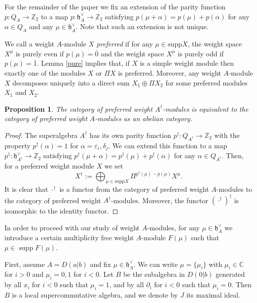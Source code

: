 \documentclass[12pt]{amsart}
\makeatletter
\def\@putname#1#2#3#4{\def\@@ref{#3}\let\old@bf\bf
        \def\bf##1{\old@bf\if?\noexpand##1?{#4}\else##1\fi}%
	#1{#2}%
        \let\bf\old@bf}
\def\@putname#1#2#3#4{\def\@@ref{#3}\let\old@bf\bf	%
	\let\old@reset@font\reset@font			%
        \def\bf##1{\old@bf\if?\noexpand##1?{#4}\else##1\fi}%
	\def\reset@font##1##2{\old@reset@font##1\if?\noexpand##2?{#4}\else##2\fi}#1{#2}%
        \let\bf\old@bf\let\reset@font\old@reset@font}
\let\my@ref=\ref
\def\ref#1{\@putname\my@ref{#1}{#1}{\tiny\rm\@@ref}}
\theoremstyle{plain} %
\numberwithin{equation}{section}
\theoremstyle{definition}
\theoremstyle{remark}
\theoremstyle{plain} %
\newtheorem{proposition}[definition]{Proposition}
\newcommand{\hh}{\mathfrak{h}}
\newcommand{\ZZ}{\mathbb{Z}}
\newcommand{\supp}{\mathrm{supp}}
\newcommand{\Z}{\mathbb{Z}}
\newcommand{\gh}{\mathfrak{h}}
\def\gh{\mathfrak{h}}
\makeatother
\begin{document}
        
  For the remainder of the paper we fix an extension  of the parity function $p:Q_A\to\Z_2$ to a  map $p:\hh_A^{\vee}\to \ZZ_2$ satisfying $p(\mu+\alpha)=p(\mu)+p(\alpha)$ for any $\alpha\in Q_A$
          and any $\mu\in\hh_A^{\vee}$. Note that such an extension is not unique.
          
 We call a weight $A$-module $X$ \emph{preferred} if for any $\mu \in \supp X$, the weight space $X^\mu$ is purely even if $p(\mu)=\bar 0$ and the weight space $X^\mu$ is purely odd if $p(\mu)=\bar 1$.  Lemma \ref{pure} implies that, if $X$ is a simple weight module then exactly one of the modules $X$ or $\Pi X$ is preferred. 
Moreover, any weight $A$-module
      $X$ decomposes uniquely into a direct sum $X_1\oplus\Pi X_2$ for some preferred modules $X_1$ and $X_2$. 

             
        
        \begin{proposition}\label{dagger} The category of preferred weight $A^\dagger$-modules is equivalent to the category of preferred weight $A$-modules as an abelian category.
        \end{proposition}
        \begin{proof}  The superalgebra $A^\dagger$ has its own parity function $p^\dagger:Q_{A^\dagger}\to\Z_2$ with the property
          $p^{\dagger} (\alpha) = 1$ for $\alpha = \varepsilon_i,\delta_j$. We can extend this function 
          to  a  map $p^\dagger:\hh_{A^\dagger}^{\vee}\to \ZZ_2$ satisfying $p^\dagger(\mu+\alpha)=p^\dagger(\mu)+p^\dagger(\alpha)$ for any
          $\alpha\in Q_{A^\dagger}$. Then, for a preferred weight module $X$ we set
          $$X^\dagger:=\bigoplus_{\mu\in\supp X} \Pi^{p^\dagger(\mu)-p(\mu)}X^\mu.$$
          It is clear that ${\cdot}^\dagger$ is a functor from the category of preferred weight $A$-modules to the category of preferred weight $A^\dagger$-modules. Moreover, the functor $({\cdot}^{\dagger})^\dagger$ is isomorphic to the identity functor.
        \end{proof}



In order to proceed with our study of  weight $A$-modules, for any $\mu \in \gh_A^{\vee}$ we  introduce a certain multiplicity free weight $A$-module $F(\mu)$ such that $\mu\in \operatorname{supp}F(\mu)$.

First, assume $A =D(a|b)$ and fix $\mu\in  \gh^{\vee}_A$. We can write $\mu=\{\mu_i\}$ with $\mu_i\in\mathbb C$ for $i>0$ and $\mu_i=0,1$ for $i<0$. Let $B$ be the subalgebra in $D(0|b)$ generated by all $x_i$ for  $i<0$ such that $\mu_i=1$,
and by all $\partial_i$ for  $i<0$ such that $\mu_i=0$. Then  $B$ is a local supercommutative  algebra, and we denote by $J$ its maximal ideal. 
\end{document}
